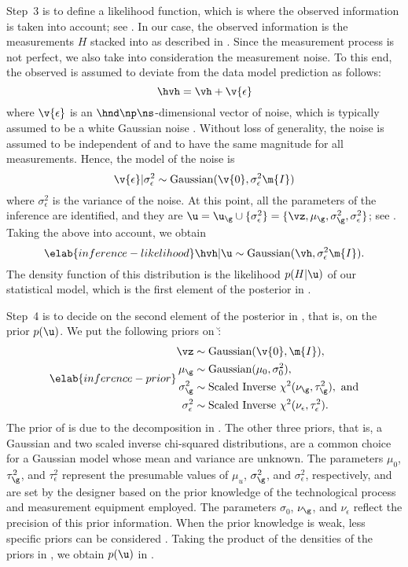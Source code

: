 Step~3 is to define a likelihood function, which is where the observed
information is taken into account; see . In our case,
the observed information is the measurements $H$ stacked into \hvh as described
in . Since the measurement process is not perfect, we
also take into consideration the measurement noise. To this end, the observed
\hvh is assumed to deviate from the data model prediction \vh as follows:
\[
  \hvh = \vh + \v{\epsilon}
\]
where $\v{\epsilon}$ is an $\hnd \np \ns$-dimensional vector of noise, which is
typically assumed to be a white Gaussian noise \cite{rasmussen2006,
marzouk2009}. Without loss of generality, the noise is assumed to be independent
of \g and to have the same magnitude for all measurements. Hence, the model of
the noise is
\[
  \v{\epsilon} | \sigma^2_\epsilon \sim \mathrm{Gaussian}(\v{0}, \sigma^2_\epsilon \m{I})
\]
where $\sigma^2_\epsilon$ is the variance of the noise. At this point, all the
parameters of the inference are identified, and they are $\u = \u_\g \cup \{
\sigma_\epsilon^2 \} = \{ \vz, \mu_\g, \sigma_\g^2, \sigma_\epsilon^2 \}$; see
. Taking the above into account, we obtain
\begin{equation} \elab{inference-likelihood}
  \hvh | \u \sim \mathrm{Gaussian}(\vh, \sigma_\epsilon^2 \m{I}).
\end{equation}
The density function of this distribution is the likelihood $p(H | \u)$ of our
statistical model, which is the first element of the posterior in
.

Step~4 is to decide on the second element of the posterior in
, that is, on the prior $p(\u)$. We put the following priors
on \u:
\begin{align} \elab{inference-prior}
  \begin{split}
    \vz               & \sim \mathrm{Gaussian}(\v{0}, \m{I}), \\
    \mu_\g            & \sim \mathrm{Gaussian}(\mu_0, \sigma^2_0), \\
    \sigma^2_\g       & \sim \mathrm{Scaled\ Inverse\ } \chi^2(\nu_\g, \tau^2_\g), \text{ and} \\
    \sigma^2_\epsilon & \sim \mathrm{Scaled\ Inverse\ } \chi^2(\nu_\epsilon, \tau^2_\epsilon).
  \end{split}
\end{align}
The prior of \vz is due to the decomposition in . The
other three priors, that is, a Gaussian and two scaled inverse chi-squared
distributions, are a common choice for a Gaussian model whose mean and variance
are unknown. The parameters $\mu_0$, $\tau^2_\g$, and $\tau^2_\epsilon$
represent the presumable values of $\mu_u$, $\sigma^2_\g$, and
$\sigma^2_\epsilon$, respectively, and are set by the designer based on the
prior knowledge of the technological process and measurement equipment employed.
The parameters $\sigma_0$, $\nu_\g$, and $\nu_\epsilon$ reflect the precision of
this prior information. When the prior knowledge is weak, less specific priors
can be considered \cite{gelman2013}. Taking the product of the densities of the
priors in , we obtain $p(\u)$ in .

